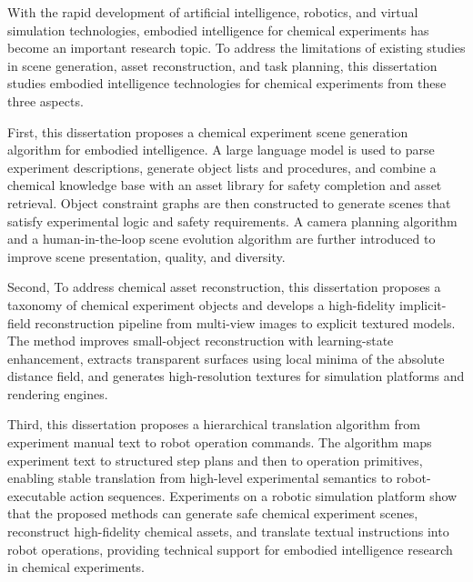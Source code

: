 \begin{enabstract}
With the rapid development of artificial intelligence, robotics, and virtual simulation technologies, embodied intelligence for chemical experiments has become an important research topic. To address the limitations of existing studies in scene generation, asset reconstruction, and task planning, this dissertation studies embodied intelligence technologies for chemical experiments from these three aspects.

First, this dissertation proposes a chemical experiment scene generation algorithm for embodied intelligence. A large language model is used to parse experiment descriptions, generate object lists and procedures, and combine a chemical knowledge base with an asset library for safety completion and asset retrieval. Object constraint graphs are then constructed to generate scenes that satisfy experimental logic and safety requirements. A camera planning algorithm and a human-in-the-loop scene evolution algorithm are further introduced to improve scene presentation, quality, and diversity.

Second, To address chemical asset reconstruction, this dissertation proposes a taxonomy of chemical experiment objects and develops a high-fidelity implicit-field reconstruction pipeline from multi-view images to explicit textured models. The method improves small-object reconstruction with learning-state enhancement, extracts transparent surfaces using local minima of the absolute distance field, and generates high-resolution textures for simulation platforms and rendering engines.

Third, this dissertation proposes a hierarchical translation algorithm from experiment manual text to robot operation commands. The algorithm maps experiment text to structured step plans and then to operation primitives, enabling stable translation from high-level experimental semantics to robot-executable action sequences. Experiments on a robotic simulation platform show that the proposed methods can generate safe chemical experiment scenes, reconstruct high-fidelity chemical assets, and translate textual instructions into robot operations, providing technical support for embodied intelligence research in chemical experiments.
\end{enabstract}

